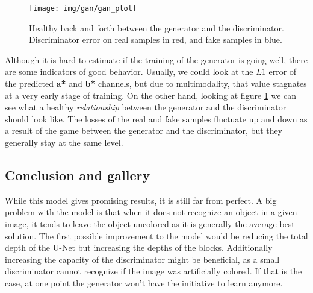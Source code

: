 \begin{figure}[!ht]
	\centering
	\texttt{[image: img/gan/gan\_plot]}
    \caption{Healthy back and forth between the generator and the discriminator. 
	Discriminator error on real samples in red, and fake samples in blue.}
	\label{fig:gan_plot}
\end{figure}

Although it is hard to estimate if the training of the generator is going well, there 
are some indicators of good behavior. Usually, we could look at the $L1$ error of 
the predicted \textbf{a*} and \textbf{b*} channels, but due to multimodality, that 
value stagnates at a very early stage of training. On the other hand, looking at 
figure \ref{fig:gan_plot} we can see what a healthy \textit{relationship} between
the generator and the discriminator should look like. The losses of the real and fake 
samples fluctuate up and down as a result of the game between the generator and 
the discriminator, but they generally stay at the same level.

\subsection{Conclusion and gallery}

While this model gives promising results, it is still far from perfect. 
A big problem with the model is that when it does not recognize an object
in a given image, it tends to leave the object uncolored as it is 
generally the average best solution. The first possible improvement to the
model would be reducing the total depth of the U-Net but increasing the
depths of the blocks. Additionally increasing the capacity of the discriminator
might be beneficial, as a small discriminator cannot recognize if the image 
was artificially colored. If that is the case, at one point the generator 
won't have the initiative to learn anymore. 

